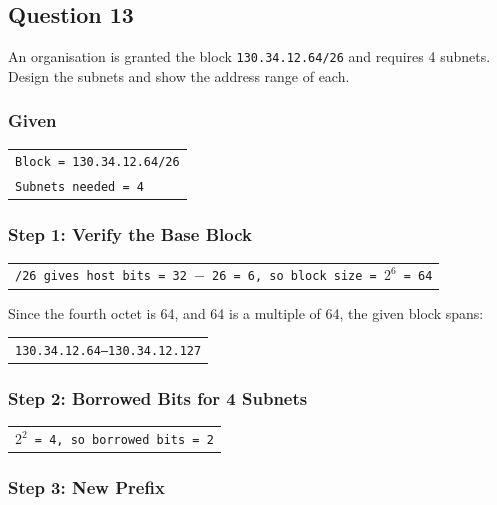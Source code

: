\documentclass[11pt,a4paper]{article}
\begin{document}
\subsection*{Question 13}

An organisation is granted the block \texttt{130.34.12.64/26} and requires 4 subnets. Design
the subnets and show the address range of each.

\subsubsection*{Given}

\begin{tabularx}{\textwidth}{@{}X@{}}
\texttt{Block = 130.34.12.64/26} \\
\texttt{Subnets needed = 4} \\
\end{tabularx}

\subsubsection*{Step 1: Verify the Base Block}

\begin{tabularx}{\textwidth}{@{}X@{}}
\texttt{/26 gives host bits = 32 $-$ 26 = 6, so block size = $2^{6}$ = 64} \\
\end{tabularx}

Since the fourth octet is 64, and 64 is a multiple of 64, the given block spans:

\begin{tabularx}{\textwidth}{@{}X@{}}
\texttt{130.34.12.64--130.34.12.127} \\
\end{tabularx}

\subsubsection*{Step 2: Borrowed Bits for 4 Subnets}

\begin{tabularx}{\textwidth}{@{}X@{}}
\texttt{$2^{2}$ = 4, so borrowed bits = 2} \\
\end{tabularx}

\subsubsection*{Step 3: New Prefix}
\end{document}
